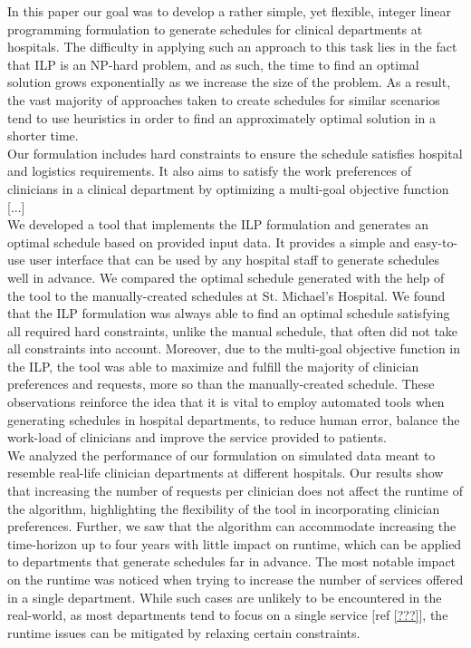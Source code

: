 In this paper our goal was to develop a rather simple, yet flexible, integer linear programming formulation to generate schedules for clinical departments at hospitals. The difficulty in applying such an approach to this task lies in the fact that ILP is an NP-hard problem, and as such, the time to find an optimal solution grows exponentially as we increase the size of the problem. As a result, the vast majority of approaches taken to create schedules for similar scenarios tend to use heuristics in order to find an approximately optimal solution in a shorter time. \\

Our formulation includes hard constraints to ensure the schedule satisfies hospital and logistics requirements. It also aims to satisfy the work preferences of clinicians in a clinical department by optimizing a multi-goal objective function [...] \\

We developed a tool that implements the ILP formulation and generates an optimal schedule based on provided input data. It provides a simple and easy-to-use user interface that can be used by any hospital staff to generate schedules well in advance. We compared the optimal schedule generated with the help of the tool to the manually-created schedules at St. Michael's Hospital. We found that the ILP formulation was always able to find an optimal schedule satisfying all required hard constraints, unlike the manual schedule, that often did not take all constraints into account. Moreover, due to the multi-goal objective function in the ILP, the tool was able to maximize and fulfill the majority of clinician preferences and requests, more so than the manually-created schedule. These observations reinforce the idea that it is vital to employ automated tools when generating schedules in hospital departments, to reduce human error, balance the work-load of clinicians and improve the service provided to patients. \\

We analyzed the performance of our formulation on simulated data meant to resemble real-life clinician departments at different hospitals. Our results show that increasing the number of requests per clinician does not affect the runtime of the algorithm, highlighting the flexibility of the tool in incorporating clinician preferences. Further, we saw that the algorithm can accommodate increasing the time-horizon up to four years with little impact on runtime, which can be applied to departments that generate schedules far in advance. The most notable impact on the runtime was noticed when trying to increase the number of services offered in a single department. While such cases are unlikely to be encountered in the real-world, as most departments tend to focus on a single service [ref \ref{???}], the runtime issues can be mitigated by relaxing certain constraints. \\

